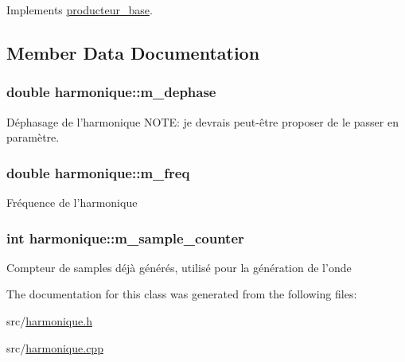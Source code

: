 Implements \hyperlink{classproducteur__base_af1e171c9e69b0998d5124c7389737f82}{producteur\-\_\-base}.



\subsection{Member Data Documentation}
\hypertarget{classharmonique_a2ba9d8b0702651bbbf67d4d7f7316c3e}{
\subsubsection[{m\-\_\-dephase}]{\setlength{\rightskip}{0pt plus 5cm}double harmonique\-::m\-\_\-dephase\hspace{0.3cm}{\ttfamily [private]}}}\label{classharmonique_a2ba9d8b0702651bbbf67d4d7f7316c3e}
Déphasage de l'harmonique N\-O\-T\-E\-: je devrais peut-\/être proposer de le passer en paramètre. \hypertarget{classharmonique_a8f9a721707c36033703863f22d6b70a8}{
\subsubsection[{m\-\_\-freq}]{\setlength{\rightskip}{0pt plus 5cm}double harmonique\-::m\-\_\-freq\hspace{0.3cm}{\ttfamily [private]}}}\label{classharmonique_a8f9a721707c36033703863f22d6b70a8}
Fréquence de l'harmonique \hypertarget{classharmonique_a648d5e64e0e8b8a5c9d4af4146ad93ae}{
\subsubsection[{m\-\_\-sample\-\_\-counter}]{\setlength{\rightskip}{0pt plus 5cm}int harmonique\-::m\-\_\-sample\-\_\-counter\hspace{0.3cm}{\ttfamily [private]}}}\label{classharmonique_a648d5e64e0e8b8a5c9d4af4146ad93ae}
Compteur de samples déjà générés, utilisé pour la génération de l'onde 

The documentation for this class was generated from the following files\-:\begin{DoxyCompactItemize}
\item 
src/\hyperlink{harmonique_8h}{harmonique.\-h}\item 
src/\hyperlink{harmonique_8cpp}{harmonique.\-cpp}\end{DoxyCompactItemize}
